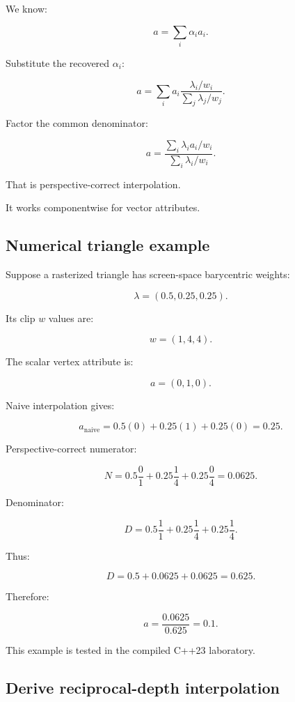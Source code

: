 \hypertarget{02-foundations-ii-ch034-recover-the-attribute}{}

We know:

\[
 a=\sum_i\alpha_i a_i.
\]

Substitute the recovered \(\alpha_i\):

\[
 a= \sum_i a_i \frac{\lambda_i/w_i} {\sum_j\lambda_j/w_j}.
\]

Factor the common denominator:

\[
 \boxed{ a= \frac{ \sum_i\lambda_i a_i/w_i }{ \sum_i\lambda_i/w_i } }.
\]

That is perspective-correct interpolation.

It works componentwise for vector attributes.

\subsection{Numerical triangle example}\label{02-foundations-ii-ch034-numerical-triangle-example}

\hypertarget{02-foundations-ii-ch034-numerical-triangle-example}{}

Suppose a rasterized triangle has screen-space barycentric weights:

\[
 \lambda=(0.5,0.25,0.25).
\]

Its clip \(w\) values are:

\[
 w=(1,4,4).
\]

The scalar vertex attribute is:

\[
 a=(0,1,0).
\]

Naive interpolation gives:

\[
 a_{\mathrm{naive}} = 0.5(0)+0.25(1)+0.25(0) =\boxed{0.25}.
\]

Perspective-correct numerator:

\[
 N= 0.5\frac01+ 0.25\frac14+ 0.25\frac04 =0.0625.
\]

Denominator:

\[
 D= 0.5\frac11+ 0.25\frac14+ 0.25\frac14.
\]

Thus:

\[
 D=0.5+0.0625+0.0625=0.625.
\]

Therefore:

\[
 \boxed{ a=\frac{0.0625}{0.625}=0.1 }.
\]

This example is tested in the compiled C++23 laboratory.

\subsection{Derive reciprocal-depth interpolation}\label{02-foundations-ii-ch034-derive-reciprocal-depth-interpolation}

